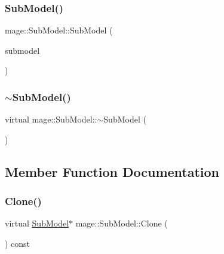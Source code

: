 \subsubsection{\texorpdfstring{Sub\+Model()}{SubModel()}\hspace{0.1cm}{\footnotesize\ttfamily [3/3]}}
{\footnotesize\ttfamily mage\+::\+Sub\+Model\+::\+Sub\+Model (\begin{DoxyParamCaption}\item[{\hyperlink{classmage_1_1_sub_model}{Sub\+Model} \&\&}]{submodel }\end{DoxyParamCaption})}

\hypertarget{classmage_1_1_sub_model_a0e92faaeeeec8d4c55c67adf4a501d0d}{}\label{classmage_1_1_sub_model_a0e92faaeeeec8d4c55c67adf4a501d0d} 
\subsubsection{\texorpdfstring{$\sim$\+Sub\+Model()}{~SubModel()}}
{\footnotesize\ttfamily virtual mage\+::\+Sub\+Model\+::$\sim$\+Sub\+Model (\begin{DoxyParamCaption}{ }\end{DoxyParamCaption})\hspace{0.3cm}{\ttfamily [virtual]}}



\subsection{Member Function Documentation}
\hypertarget{classmage_1_1_sub_model_a368bcc2ee819cc29ec0203e314ae91d3}{}\label{classmage_1_1_sub_model_a368bcc2ee819cc29ec0203e314ae91d3} 
\subsubsection{\texorpdfstring{Clone()}{Clone()}}
{\footnotesize\ttfamily virtual \hyperlink{classmage_1_1_sub_model}{Sub\+Model}$\ast$ mage\+::\+Sub\+Model\+::\+Clone (\begin{DoxyParamCaption}{ }\end{DoxyParamCaption}) const\hspace{0.3cm}{\ttfamily [virtual]}}



